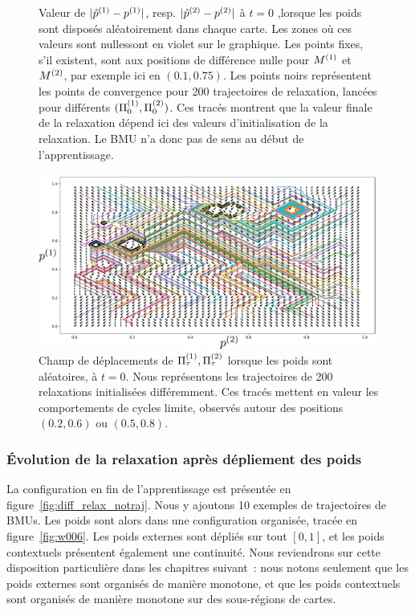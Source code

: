\documentclass[../main]{subfiles}
\begin{document}
\begin{figure}
\begin{minipage}{0.5\textwidth}
	\end{minipage}
	\caption{Valeur de $\lvert {\hat{p}}^{({1})} - p^{({1})} \rvert $, resp. $\lvert {\hat{p}}^{({2})} - p^{({2})} \rvert$ à $t=0$ ,lorsque les poids sont disposés aléatoirement dans chaque carte.
	Les zones où ces valeurs sont nullessont en violet sur le graphique. Les points fixes, s'il existent, sont aux positions de différence nulle pour $M^{({1})}$ et $M^{({2})}$, par exemple ici en $(0.1, 0.75)$.
	Les points noirs représentent les points de convergence pour 200 trajectoires de relaxation, lancées pour différents $(\Pi_0^{({1})}, \Pi_0^{({2})})$.
	Ces tracés montrent que la valeur finale de la relaxation dépend ici des valeurs d'initialisation de la relaxation. Le BMU n'a donc pas de sens au début de l'apprentissage. \label{fig:diff_relax_t1_notraj}}
	\end{figure}
	
	\begin{figure}
		\centering
		\includegraphics[width=\textwidth]{champ_006_t1.pdf}
		\caption{Champ de déplacements de $\Pi^{({1})}_\tau,\Pi^{({2})}_\tau$ lorsque les poids sont aléatoires, à $t=0$. Nous représentons les trajectoires de 200 relaxations initialisées différemment. Ces tracés mettent en valeur les comportements de cycles limite, observés autour des positions $(0.2, 0.6)$ ou $(0.5, 0.8)$.}
		\label{fig:champ_0}
		\end{figure}
		
\subsubsection{\'Evolution de la relaxation après dépliement des poids}

La configuration en fin de l'apprentissage est présentée en figure~\ref{fig:diff_relax_notraj}. Nous y ajoutons 10 exemples de trajectoires de BMUs.
Les poids sont alors dans une configuration organisée, tracée en figure~\ref{fig:w006}. 
Les poids externes sont dépliés sur tout $[0,1]$, et les poids contextuels présentent également une continuité. Nous reviendrons sur cette disposition particulière dans les chapitres suivant~: nous notons seulement que les poids externes sont organisés de manière monotone, et que les poids contextuels sont organisés de manière monotone sur des sous-régions de cartes.
\end{document}
